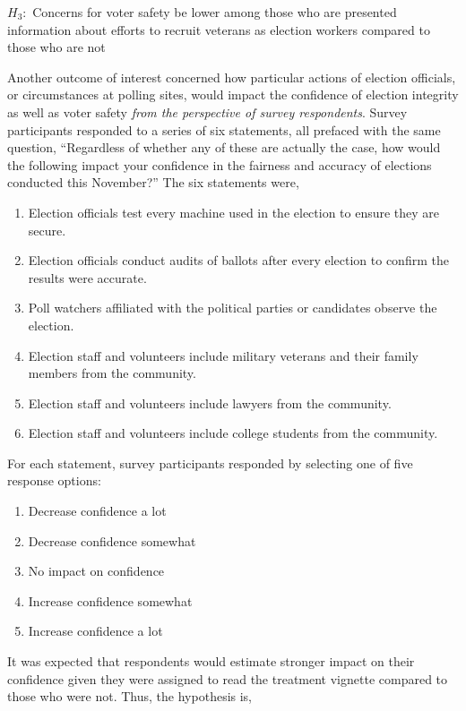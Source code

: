 \documentclass[
  11pt,
  a4paper,
]{scrartcl}
\providecommand{\tightlist}{%
  \setlength{\itemsep}{0pt}\setlength{\parskip}{0pt}}\usepackage{longtable,booktabs,array}
\begin{document}
\(H_{3}:\) Concerns for voter safety be lower among those who are
presented information about efforts to recruit veterans as election
workers compared to those who are not

Another outcome of interest concerned how particular actions of election
officials, or circumstances at polling sites, would impact the
confidence of election integrity as well as voter safety \emph{from the
perspective of survey respondents}. Survey participants responded to a
series of six statements, all prefaced with the same question,
``Regardless of whether any of these are actually the case, how would
the following impact your confidence in the fairness and accuracy of
elections conducted this November?'' The six statements were,

\begin{enumerate}
\def\labelenumi{\arabic{enumi}.}
\tightlist
\item
  Election officials test every machine used in the election to ensure
  they are secure.
\item
  Election officials conduct audits of ballots after every election to
  confirm the results were accurate.
\item
  Poll watchers affiliated with the political parties or candidates
  observe the election.
\item
  Election staff and volunteers include military veterans and their
  family members from the community.
\item
  Election staff and volunteers include lawyers from the community.
\item
  Election staff and volunteers include college students from the
  community.
\end{enumerate}

For each statement, survey participants responded by selecting one of
five response options:

\begin{enumerate}
\def\labelenumi{\arabic{enumi}.}
\tightlist
\item
  Decrease confidence a lot
\item
  Decrease confidence somewhat
\item
  No impact on confidence
\item
  Increase confidence somewhat
\item
  Increase confidence a lot
\end{enumerate}

It was expected that respondents would estimate stronger impact on their
confidence given they were assigned to read the treatment vignette
compared to those who were not. Thus, the hypothesis is,
\end{document}
